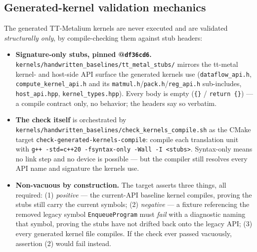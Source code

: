 \subsection{Generated-kernel validation mechanics}\label{sec:software-stubs}

The generated TT-Metalium kernels are never executed and are validated
\emph{structurally only}, by compile-checking them against stub headers:

\begin{itemize}[nosep]
  \item \textbf{Signature-only stubs, pinned @\texttt{df36cd6}.}
        \texttt{kernels/handwritten\_baselines/tt\_metal\_stubs/} mirrors the
        tt-metal kernel- and host-side API surface the generated kernels use
        (\texttt{dataflow\_api.h}, \texttt{compute\_kernel\_api.h} and its
        \texttt{matmul.h}/\texttt{pack.h}/\texttt{reg\_api.h} sub-includes,
        \texttt{host\_api.hpp}, \texttt{kernel\_types.hpp}). Every body is
        empty (\texttt{\{\}} / \texttt{return \{\}}) --- a compile contract
        only, no behavior; the headers say so verbatim.
  \item \textbf{The check itself} is orchestrated by
        \texttt{kernels/handwritten\_baselines/check\_kernels\_compile.sh} as
        the CMake target \texttt{check-generated-kernels-compile}: compile
        each translation unit with
        \texttt{g++ -std=c++20 -fsyntax-only -Wall -I <stubs>}.
        Syntax-only means no link step and no device is possible --- but the
        compiler still resolves every API name and signature the kernels use.
  \item \textbf{Non-vacuous by construction.} The target asserts three
        things, all required: (1) \emph{positive} --- the current-API
        baseline kernel compiles, proving the stubs still carry the current
        symbols; (2) \emph{negative} --- a fixture referencing the removed
        legacy symbol \texttt{EnqueueProgram} must \emph{fail} with a
        diagnostic naming that symbol, proving the stubs have not drifted
        back onto the legacy API; (3) every generated kernel file compiles.
        If the check ever passed vacuously, assertion (2) would fail instead.
\end{itemize}
